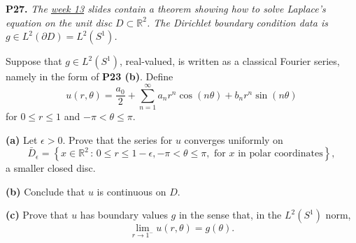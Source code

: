 \documentclass[12pt]{amsart}
\newcommand{\RR}{\mathbb{R}}
\newcommand{\eps}{\epsilon}
\newcommand{\prob}[1]{\bigskip\noindent\textbf{#1.}\quad }
\newcommand{\epart}[1]{\medskip\noindent\textbf{(#1)}\quad }
\begin{document}
\prob{P27}  \emph{The \href{https://bueler.github.io/fa/assets/slides/S26/week13.pdf}{week 13} slides contain a theorem showing how to solve Laplace's equation on the unit disc $D\subset \RR^2$.  The Dirichlet boundary condition data is $g\in L^2(\partial D)=L^2(S^1)$.}

\medskip \noindent Suppose that $g\in L^2(S^1)$, real-valued, is written as a classical Fourier series, namely in the form of \textbf{P23 (b)}.  Define
    $$u(r,\theta) = \frac{a_0}{2} + \sum_{n=1}^\infty a_n r^n \cos(n\theta) + b_n r^n \sin(n\theta)$$
for $0\le r\le 1$ and $-\pi < \theta \le \pi$. 

\epart{a}  Let $\eps>0$.  Prove that the series for $u$ converges uniformly on
	$$\bar D_\eps = \left\{x\in \RR^2\,:\,0\le r\le 1-\eps, -\pi < \theta \le \pi, \text{ for $x$ in polar coordinates}\right\},$$
a smaller closed disc.

\epart{b}  Conclude that $u$ is continuous on $D$.

\epart{c}  Prove that $u$ has boundary values $g$ in the sense that, in the $L^2(S^1)$ norm,
    $$\lim_{r\to 1^-} u(r,\theta) = g(\theta).$$
\end{document}
